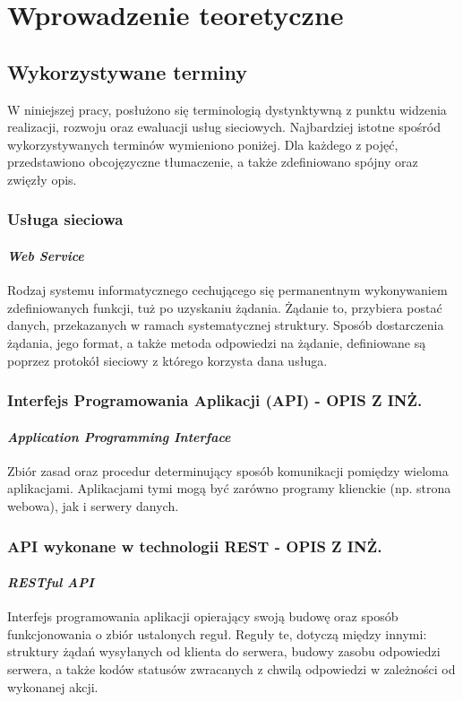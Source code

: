 \chapter{Wprowadzenie teoretyczne}
\section{Wykorzystywane terminy}
\label{sec:terminy}
W niniejszej pracy, posłużono się terminologią dystynktywną z punktu widzenia realizacji, rozwoju oraz ewaluacji usług sieciowych. Najbardziej istotne spośród wykorzystywanych terminów wymieniono poniżej. Dla każdego z pojęć, przedstawiono obcojęzyczne tłumaczenie, a także zdefiniowano spójny oraz zwięzły opis.

\subsection*{Usługa sieciowa}
\subsubsection{\textit{Web Service}}
Rodzaj systemu informatycznego cechującego się permanentnym wykonywaniem zdefiniowanych funkcji, tuż po uzyskaniu żądania. Żądanie to, przybiera postać danych, przekazanych w ramach systematycznej struktury. Sposób dostarczenia żądania, jego format, a także metoda odpowiedzi na żądanie, definiowane są poprzez protokół sieciowy z którego korzysta dana usługa.

\subsection*{Interfejs Programowania Aplikacji (API) - OPIS Z INŻ.}
\subsubsection{\textit{Application Programming Interface}}
Zbiór zasad oraz procedur determinujący sposób komunikacji pomiędzy wieloma aplikacjami. Aplikacjami tymi mogą być zarówno programy klienckie (np. strona webowa), jak i serwery danych.

\subsection*{API wykonane w technologii REST - OPIS Z INŻ.}
\subsubsection{\textit{RESTful API}}
Interfejs programowania aplikacji opierający swoją budowę oraz sposób funkcjonowania o zbiór ustalonych reguł. Reguły te, dotyczą między innymi: struktury żądań wysyłanych od klienta do serwera, budowy zasobu odpowiedzi serwera, a także kodów statusów zwracanych z chwilą odpowiedzi w zależności od wykonanej akcji.

